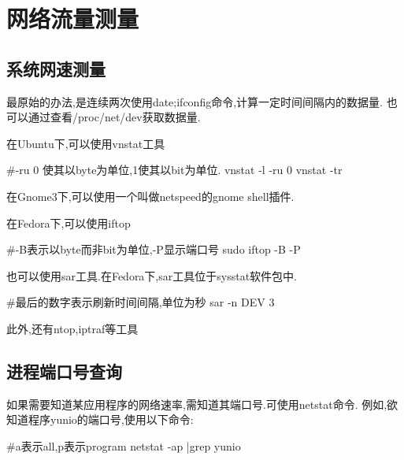 \section{网络流量测量}
\subsection{系统网速测量}
最原始的办法,是连续两次使用date;ifconfig命令,计算一定时间间隔内的数据量.
也可以通过查看/proc/net/dev获取数据量.

在Ubuntu下,可以使用vnstat工具
\begin{shellcmd}
#-ru 0 使其以byte为单位,1使其以bit为单位.
vnstat -l -ru 0  
vnstat -tr
\end{shellcmd}
在Gnome3下,可以使用一个叫做netspeed的gnome shell插件.

在Fedora下,可以使用iftop
\begin{shellcmd}
#-B表示以byte而非bit为单位,-P显示端口号
sudo iftop -B -P 
\end{shellcmd}
也可以使用sar工具.在Fedora下,sar工具位于sysstat软件包中.
\begin{shellcmd}
#最后的数字表示刷新时间间隔,单位为秒
sar -n DEV 3 
\end{shellcmd}
此外,还有ntop,iptraf等工具
\subsection{进程端口号查询}
如果需要知道某应用程序的网络速率,需知道其端口号.可使用netstat命令.
例如,欲知道程序yunio的端口号,使用以下命令:
\begin{shellcmd}
#a表示all,p表示program
netstat -ap |grep yunio 
\end{shellcmd}




